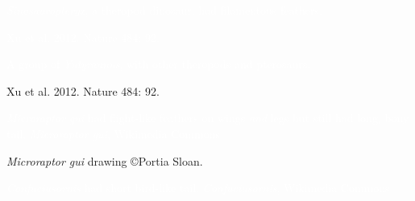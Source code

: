 {
\begin{frame}[t,plain]{\textcolor{white}{\textit{Sinosauropteryx}, a theropod dinosaur, had filamentous feathers.}}
\end{frame}
}

{
\begin{frame}[t,plain]
\end{frame}
}

{
\begin{frame}[b,plain]
\hfill\tiny\textcolor{white}{Xu et al. 2012. Nature 484: 92.}
\end{frame}
}
{
\begin{frame}[t,plain]{\textcolor{white}{A group of \textit{Yutyrannus}, with other theropods and pterosaurs.} }
\end{frame}
}

{
\begin{frame}[b,plain]
\hfill\tiny Xu et al. 2012. Nature 484: 92.
\end{frame}
}

{
\begin{frame}[b,plain]{\textcolor{white}{\textit{Microraptor gui} had flight-like feathers on wings \emph{and} legs but still had long, bony tail.}}
\hfill\tiny\textcolor{white}{\textit{Microraptor gui}, Wikimedia Commons}
\end{frame}
}

{
\begin{frame}[b,plain]
\tiny\hfill\textit{Microraptor gui} drawing \copyright Portia Sloan.
\end{frame}
}

{
\begin{frame}[b,plain]{\textcolor{white}{\textit{Confuciusornis} had short bird-like tail.}}
\hfill\tiny\textcolor{white}{\textit{Confuciusornis}, Wikimedia Commons}
\end{frame}
}

